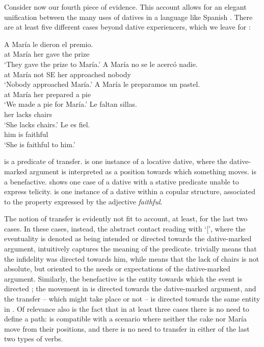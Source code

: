 \documentclass[output=paper,colorlinks,citecolor=brown,nonflat]{langsci/langscibook}
\begin{document}
Consider now our fourth piece of evidence. This account allows for an elegant unification between the many uses of datives in a language like Spanish \citep{RAEASALE2009}. There are at least five different cases beyond dative experiencers, which we leave for :

\ea%
    \label{ex:fabregas:24}
    \ea\label{ex:fabregas:24a}
    \gll    A María le     dieron el   premio.\\
            {at} {María} {her}   {gave}    {the}  {prize}\\
    \glt `They gave the prize to María.'
    \ex\label{ex:fabregas:24b}
    \gll    A María  no  se  le   acercó      nadie.\\
            {at} {María} {not} {SE} {her} {approached} {nobody}\\
    \glt `Nobody approached María.'
    \ex\label{ex:fabregas:24c}
    \gll    A María  le   preparamos un pastel.\\
            {at} {María} {her}   {prepared}      {a}   {pie}\\
    \glt `We made a pie for María.'
    \ex\label{ex:fabregas:24d}
    \gll    Le  faltan sillas.\\
            {her} {lacks}  {chairs}\\
    \glt `She lacks chairs.'
    \ex\label{ex:fabregas:24e}
    \gll    Le   es fiel.\\
            {him} {is}  {faithful}\\
    \glt `She is faithful to him.'
    \z
\z

 is a predicate of transfer.  is one instance of a locative dative, where the dative-marked argument is interpreted as a position towards which something moves.  is a benefactive.  shows one case of a dative with a stative predicate unable to express telicity.  is one instance of a dative within a copular structure, associated to the property expressed by the adjective \textit{faithful}.

The notion of transfer is evidently not fit to account, at least, for the last two cases. In these cases, instead, the abstract contact reading with `[', where the eventuality is denoted as being intended or directed towards the dative-marked argument, intuitively captures the meaning of the predicate.  trivially means that the infidelity was directed towards him, while  means that the lack of chairs is not absolute, but oriented to the needs or expectations of the dative-marked argument. Similarly, the benefactive is the entity towards which the event is directed ; the movement in  is directed towards the dative-marked argument, and the transfer – which might take place or not – is directed towards the same entity in . Of relevance also is the fact that in at least three cases there is no need to define a path:  is compatible with a scenario where neither the cake nor María move from their positions, and there is no need to transfer in either of the last two types of verbs.
\end{document}
